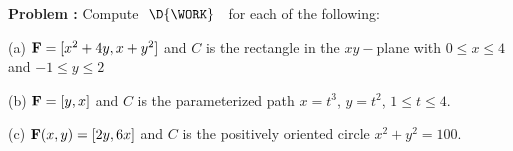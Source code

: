 {\bf Problem :} Compute \,\,$\D{\WORK}$ \,\, for each of the following:

\quad (a) ${\bf F} = [x^2 + 4y, x + y^2]$ and $C$ is the rectangle in the $xy-$plane with $0 \le x \le 4$ and $-1 \le y \le 2$

\quad (b) \({\bf F} = [y, x]\) and \(C\) is the parameterized path \(x = t^{3}\), \(y=t^{2}\), \(1\le t \le 4\).

\quad (c) \({\bf F}(x,y) = [2 y, 6 x]\) and \(C\) is the positively oriented circle \(x^{2} + y^{2} = 100\).
\
